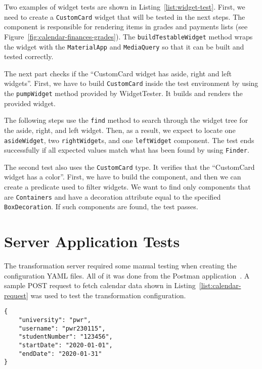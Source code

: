 Two examples of widget tests are shown in Listing~\ref{list:widget-test}. First, we need to create a \texttt{CustomCard} widget that will be tested in the next steps. The component is responsible for rendering items in grades and payments lists (see Figure~\ref{fig:calendar-finances-grades}). The \texttt{buildTestableWidget} method wraps the widget with the \texttt{MaterialApp} and \texttt{MediaQuery} so that it can be built and tested correctly.

The next part checks if the ``CustomCard widget has aside, right and left widgets''. First, we have to build \texttt{CustomCard} inside the test environment by using the \texttt{pumpWidget} method provided by WidgetTester. It builds and renders the provided widget.

The following steps use the \texttt{find} method to search through the widget tree for the aside, right, and left widget. Then, as a result, we expect to locate one \texttt{asideWidget}, two \texttt{rightWidget}s, and one \texttt{leftWidget} component. The test ends successfully if all expected values match what has been found by using \texttt{Finder}.

The second test also uses the \texttt{CustomCard} type. It verifies that the ``CustomCard widget has a color''. First, we have to build the component, and then we can create a predicate used to filter widgets. We want to find only components that are \texttt{Containers} and have a decoration attribute equal to the specified \texttt{BoxDecoration}. If such components are found, the test passes.



\section{Server Application Tests}
The transformation server required some manual testing when creating the configuration YAML files. All of it was done from the Postman application~\cite{postman}. A sample POST request to fetch calendar data shown in Listing~\ref{list:calendar-request} was used to test the transformation configuration.

\begin{lstlisting}[label=list:calendar-request,caption=Sample content of the POST request to fetch calendar data]
{
	"university": "pwr",
	"username": "pwr230115",
	"studentNumber": "123456",
	"startDate": "2020-01-01",
	"endDate": "2020-01-31"
}
\end{lstlisting}

